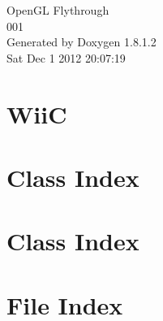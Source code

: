 \documentclass{book}
\begin{document}
\hypersetup{pageanchor=false,citecolor=blue}
\begin{titlepage}
\vspace*{7cm}
\begin{center}
{\Large Open\-G\-L Flythrough \\[1ex]\large 001 }\\
\vspace*{1cm}
{\large Generated by Doxygen 1.8.1.2}\\
\vspace*{0.5cm}
{\small Sat Dec 1 2012 20:07:19}\\
\end{center}
\end{titlepage}
\clearemptydoublepage
{}
\tableofcontents
\clearemptydoublepage
{}
\hypersetup{pageanchor=true,citecolor=blue}
\chapter{Wii\-C}
\label{index}\hypertarget{index}{}
\chapter{Class Index}

\chapter{Class Index}

\chapter{File Index}

\end{document}
